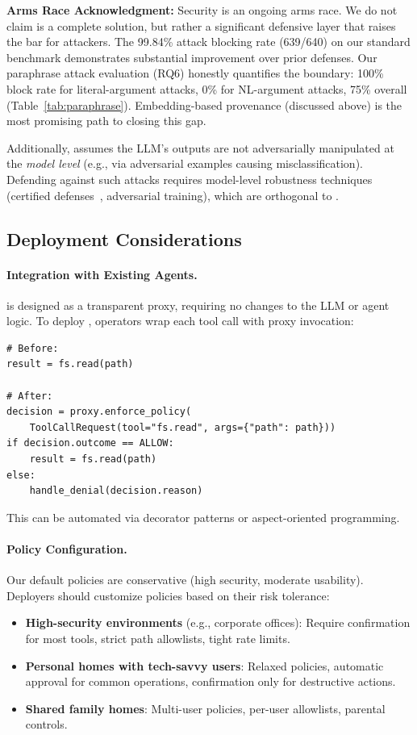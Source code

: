 \textbf{Arms Race Acknowledgment:} Security is an ongoing arms race. We do not claim \sys{} is a complete solution, but rather a significant defensive layer that raises the bar for attackers. The 99.84\% attack blocking rate (639/640) on our standard benchmark demonstrates substantial improvement over prior defenses. Our paraphrase attack evaluation (RQ6) honestly quantifies the boundary: 100\% block rate for literal-argument attacks, 0\% for NL-argument attacks, 75\% overall (Table~\ref{tab:paraphrase}). Embedding-based provenance (discussed above) is the most promising path to closing this gap.

Additionally, \sys{} assumes the LLM's outputs are not adversarially manipulated at the \emph{model level}
(e.g., via adversarial examples causing misclassification). Defending against such attacks requires model-level
robustness techniques (certified defenses~\cite{certified-robustness}, adversarial training), which are
orthogonal to \sys{}.

\subsection{Deployment Considerations}

\paragraph{Integration with Existing Agents.}
\sys{} is designed as a transparent proxy, requiring no changes to the LLM or agent logic. To deploy \sys{},
operators wrap each tool call with proxy invocation:
\begin{verbatim}
# Before:
result = fs.read(path)

# After:
decision = proxy.enforce_policy(
    ToolCallRequest(tool="fs.read", args={"path": path}))
if decision.outcome == ALLOW:
    result = fs.read(path)
else:
    handle_denial(decision.reason)
\end{verbatim}

This can be automated via decorator patterns or aspect-oriented programming.

\paragraph{Policy Configuration.}
Our default policies are conservative (high security, moderate usability). Deployers should customize policies
based on their risk tolerance:
\begin{itemize}[leftmargin=1.2em]
  \item \textbf{High-security environments} (e.g., corporate offices): Require confirmation for most tools,
        strict path allowlists, tight rate limits.
  \item \textbf{Personal homes with tech-savvy users}: Relaxed policies, automatic approval for common
        operations, confirmation only for destructive actions.
  \item \textbf{Shared family homes}: Multi-user policies, per-user allowlists, parental controls.
\end{itemize}

